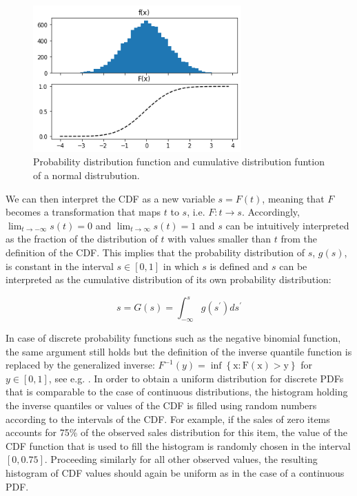 \documentclass[BCOR=1mm, DIV=calc,10pt,
twoside=true,
twocolumn,
headings=normal]{scrartcl}
\begin{document}
\begin{figure}
\begin{center}
\includegraphics[width=8cm]{../figures/PdfCdf}
\caption{\label{fig:PdfCdf} Probability distribution function and cumulative distribution funtion of a normal distrubution.}
\end{center}
\end{figure}

We can then interpret the CDF as a new variable $s = F(t)$, meaning that $F$ becomes a transformation that maps $t$ to $s$, i.e. $F:t \to s$. Accordingly,  $\lim_{t \to -\infty}s(t) = 0$ and $\lim_{t \to \infty}s(t) = 1$ and $s$ can be intuitively interpreted as the fraction of the distribution of $t$ with values smaller than $t$ from the definition of the CDF. This implies that the probability distribution of $s$, $g(s)$, is constant in the interval $s\in [0,1]$ in which $s$ is defined and $s$ can be interpreted as the cumulative distribution of its own probability distribution:

\begin{equation}
s = G(s) = \int_{-\infty}^{s} g(s^\prime) ds^\prime
\end{equation}

In case of discrete probability functions such as the negative binomial function, the same argument still holds but the definition of the inverse quantile function is replaced by the generalized inverse: $F^{-1}(y) = \mathrm{\inf \left \{x : F(x)>y\right  \} }$ for $y \in [0,1]$, see e.g. \cite[p. 54]{casella2002statistical}. In order to obtain a uniform distribution for discrete PDFs that is comparable to the case of continuous distributions, the histogram holding the inverse quantiles or values of the CDF is filled using random numbers according to the intervals of the CDF. For example, if the sales of zero items accounts for 75\% of the observed sales distribution for this item, the value of the CDF function that is used to fill the histogram is randomly chosen in the interval $[0,0.75]$. Proceeding similarly for all other observed values, the resulting histogram of CDF values should again be uniform as in the case of a continuous PDF.
\end{document}
